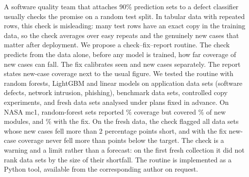 A software quality team that attaches 90\% prediction sets to a defect classifier usually checks the promise on a random test split. In tabular data with repeated rows, this check is misleading: many test rows have an exact copy in the training data, so the check averages over easy repeats and the genuinely new cases that matter after deployment. We propose a check--fix--report routine. The check predicts from the data alone, before any model is trained, how far coverage of new cases can fall. The fix calibrates seen and new cases separately. The report states new-case coverage next to the usual figure. We tested the routine with random forests, LightGBM and linear models on \NCsNFlagTotal{} application data sets (software defects, network intrusion, phishing), \NNTotal{} benchmark data sets, controlled copy experiments, and \NScpN{} fresh data sets analysed under plans fixed in advance. On NASA mc1, random-forest sets reported \NCsMcOneReported{}\% coverage but covered \NCsMcOneNew{}\% of new modules, and \NCsMcOneFixed{}\% with the fix. On the fresh data, the check flagged all \NScpPos{} data sets whose new cases fell more than 2 percentage points short, and with the fix new-case coverage never fell more than \NWTwoWorstFixAbs{} points below the target. The check is a warning and a limit rather than a forecast: on the first fresh collection it did not rank data sets by the size of their shortfall. The routine is implemented as a Python tool, available from the corresponding author on request.
